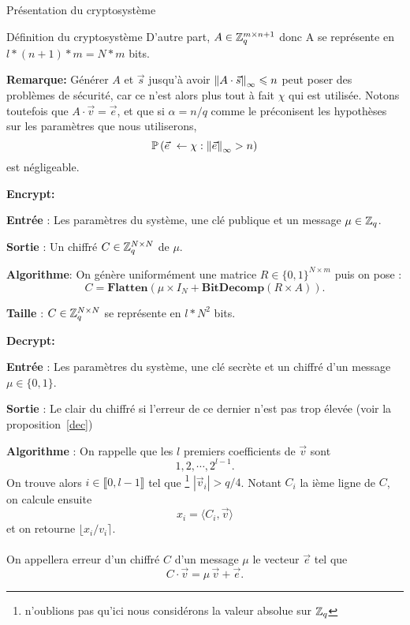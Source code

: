 \begin{section}{Présentation du cryptosystème}
\begin{subsection}{Définition du cryptosystème}
	D'autre part, $A \in \mathbb{Z}_q^{m \times n+1}$ donc A se représente en $l * (n + 1) * m = N * m$ bits.

	\textbf{Remarque:} Générer $A$ et $\vec{s}$ jusqu'à avoir ${\|A \cdot \vec{s}\|}_{\infty} \leqslant n$ peut poser des problèmes de sécurité, car ce n'est alors plus tout à fait $\chi$ qui est utilisée. Notons toutefois que $A \cdot \vec{v} = \vec{e}$, et que si $\alpha = n/q$ comme le préconisent les hypothèses sur les paramètres que nous utiliserons,
	\[ \PP\left(\vec{e} \leftarrow \chi: \norm{\vec{e}} > n\right) \]
	est négligeable.

\vspace{0.5cm}\noindent\textbf{Encrypt:}
\flushleft
	
	\textbf{Entrée} : Les paramètres du système, une clé publique et un message $\mu \in \mathbb{Z}_q$.

	\textbf{Sortie} : Un chiffré $C \in \mathbb{Z}_q^{N \times N}$ de $\mu$.

	\textbf{Algorithme}: On génère uniformément une matrice $R \in \{ 0,1\} ^{N \times m}$ puis on pose :
	\[C = \textbf{Flatten}(\mu \times I_N + \textbf{BitDecomp}(R \times A)).\]

	\textbf{Taille} : $C \in \mathbb{Z}_q^{N \times N}$ se représente en $l * N^2$ bits.
	
\vspace{0.5cm}\noindent\textbf{Decrypt:}
\flushleft
	
	\textbf{Entrée} : Les paramètres du système, une clé secrète et un chiffré d'un message $\mu \in \{ 0,1\}$.

	\textbf{Sortie} : Le clair du chiffré si l'erreur de ce dernier n'est pas trop élevée (voir la proposition~\ref{dec})

	\textbf{Algorithme} : On rappelle que les $l$ premiers coefficients de $\vec{v}$ sont 
	\[1, 2, \cdots, 2^{l-1}.\]
	On trouve alors $i\in\llbracket 0, l-1\rrbracket$ tel que
	\footnote{n'oublions pas qu'ici nous considérons la valeur absolue sur $\mathbb{Z}_q$} 
	$|\vec{v}_i| > q/4$. Notant $C_i$ la ième ligne de $C$, on calcule ensuite 
	\[ x_i = \langle C_i, \vec{v} \rangle \] et on retourne $\lfloor x_i/v_i \rceil$.


\paragraph{}
\begin{definition}
On appellera erreur d'un chiffré $C$ d'un message $\mu$ le vecteur $\vec{e}$ tel que
\[ C\cdot \vec{v} = \mu\, \vec{v} + \vec{e}. \]
\end{definition}


\end{subsection}
\end{section}
